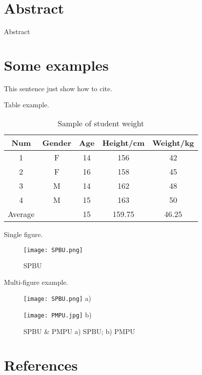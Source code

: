 


\tableofcontents
\setcounter{page}{2}
\clearpage

\section*{Abstract}

Abstract

\section{Some examples}

This sentence just show how to cite\cite{oetiker1995not}.

Table example.
\begin{table}[ht]
    \centering
    \caption{Sample of student weight}
    \label{tab:1}
        \begin{tabular}{ccccc}
        \toprule
        Num&Gender&Age&Height/cm&Weight/kg\\
        \midrule
        1&F&14&156&42\\
        2&F&16&158&45\\
        3&M&14&162&48\\
        4&M&15&163&50\\
        \cmidrule{3-5} %
        Average& &15&159.75&46.25\\
        \bottomrule
        \end{tabular}
\end{table}

Single figure.
\begin{figure}[ht]
    \centering
      \texttt{[image: SPBU.png]}
      \caption{SPBU}
      \label{fig:SPBU}
\end{figure}

\clearpage

Multi-figure example.
\begin{figure}[ht]
    \centering
    \begin{minipage}[t]{\imagewidth}
    \centering
    \texttt{[image: SPBU.png]}
    a)
    \end{minipage} \hspace{4pt}
    \begin{minipage}[t]{\imagewidth}
    \centering
    \texttt{[image: PMPU.jpg]}
    b)
    \end{minipage}
    \caption{SPBU \& PMPU a) SPBU; b) PMPU}
\end{figure}

\section*{References}
\printbibliography[heading=none]
 